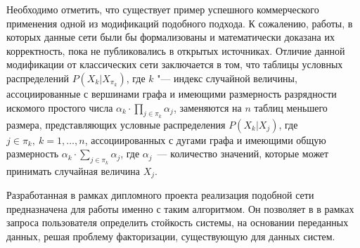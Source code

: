 Необходимо отметить, что существует пример успешного коммерческого применения одной из модификаций подобного подхода. К сожалению, работы, в которых данные сети были бы формализованы и математически доказана их корректность, пока не публиковались в открытых источниках.
Отличие данной модификации от классических сети заключается в том, что таблицы условных распределений $ P(X_k | X_{\pi_k}) $, где $k$ "--- индекс случайной величины, ассоциированные с вершинами графа и имеющими размерность разрядности искомого простого числа $ \alpha_k \cdot \prod_{j \in \pi_k}\alpha_j $, заменяются на $ n $ таблиц меньшего размера, представляющих условные распределения $ P(X_k | X_j) $, где $ j \in \pi_k,\ k = 1,\dotsc,n $, ассоциированных с дугами графа и имеющими общую размерность $ \alpha_k \cdot \sum_{j \in \pi_k}\alpha_j $, где $\alpha_j$~--- количество значений, которые может принимать случайная величина $X_j$.

Разработанная в рамках дипломного проекта реализация подобной сети предназначена для работы именно с таким алгоритмом. Он позволяет в в рамках запроса пользователя определить стойкость системы, на основании переданных данных, решая проблему факторизации, существующую для данных систем.


